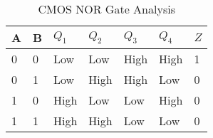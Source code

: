 \ifnum{}
\begin{frame}[fragile]

    

  \begin{table}[H]
\begin{center}
    \begin{tabular}{ |p{1cm} |p{1cm} || p{1cm} |p{1cm} |p{1cm} |p{1cm} || p{1cm} |}
    \hline 
A & B & $Q_1$ & $Q_2$ & $Q_3$ & $Q_4$ & $Z$  \\ \hline
0 & 0 & Low  & Low  & High & High & 1  \\ \hline
0 & 1 & Low  & High & High & Low  & 0 \\ \hline
1 & 0 & High & Low  & Low  & High & 0\\ \hline
1 & 1 & High & High & Low  & Low  & 0  \\ \hline
\end{tabular}
\caption{CMOS NOR Gate Analysis}
\end{center}
\end{table}
\end{frame}
\fi


